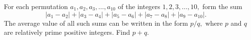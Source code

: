 For each permutation $ a_1, a_2, a_3, \ldots,a_{10}$ of the integers $ 1,2,3,\ldots,10,$ form the sum
\[ |a_1 - a_2| + |a_3 - a_4| + |a_5 - a_6| + |a_7 - a_8| + |a_9 - a_{10}|.\]
The average value of all such sums can be written in the form $ p/q,$ where $ p$ and $ q$ are relatively prime positive integers.  Find $ p + q.$